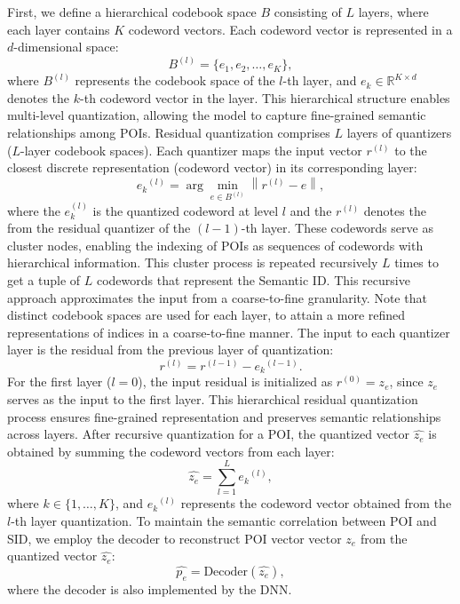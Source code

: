 First, we define a hierarchical codebook space $B$ consisting of $L$ layers, where each layer contains $K$ codeword vectors. 
Each codeword vector is represented in a $d$-dimensional space:
\begin{equation}
    B^{(l)} = \{e_1, e_2, \dots, e_K\},
\end{equation}
where $B^{(l)}$ represents the codebook space of the $l$-th layer, and $e_k \in \mathbb{R}^{K \times d}$ denotes the $k$-th codeword vector in the layer. 
This hierarchical structure enables multi-level quantization, allowing the model to capture fine-grained semantic relationships among POIs.
Residual quantization comprises $L$ layers of quantizers (\aka $L$-layer codebook spaces). 
Each quantizer maps the input vector $r^{(l)}$ to the closest discrete representation (codeword vector) in its corresponding layer:
\begin{equation}
{e_k}^{(l)} = \arg\min_{e \in B^{(l)}} \left\|{r}^{(l)}-e \right\|, 
\end{equation}
where the  $e_k^{(l)}$  is the quantized codeword at level  $l$  and the  ${r}^{(l)}$ denotes the from the residual quantizer of the $(l-1)$-th layer. 
These codewords serve as cluster nodes, enabling the indexing of POIs as sequences of codewords with hierarchical information. This cluster process is repeated recursively $L$ times to get a tuple of  $L$ codewords that represent the Semantic ID. This recursive approach approximates the input from a coarse-to-ﬁne granularity. Note that distinct codebook spaces are used for each layer, to attain a more refined representations of indices in a coarse-to-fine manner. 
The input to each quantizer layer is the residual from the previous layer of quantization:
\begin{equation}
{r}^{(l)} = {r}^{(l-1)} - {e_k}^{(l-1)}.
\end{equation}
For the first layer ($l=0$), the input residual is initialized as ${r}^{(0)} = z_e$, since $z_e$ serves as the input to the first layer. 
This hierarchical residual quantization process ensures fine-grained representation and preserves semantic relationships across layers.
After recursive quantization for a POI, the quantized vector $ \hat{z_e} $ is obtained by summing the codeword vectors from each layer:
\begin{equation}
    \hat{z_e} = \sum_{l=1}^{L} {e_k}^{(l)},
\end{equation}
where $k \in \{1, \dots, K\}$, and ${e_k}^{(l)}$ represents the codeword vector obtained from the $l$-th layer quantization. 
To maintain the semantic correlation between POI and SID, we employ the decoder to reconstruct POI vector vector ${z_e}$ from the quantized vector $ \hat{z_e} $:
\begin{equation}
    \hat{p_e} = \text{Decoder}(\hat{z_e}),
\end{equation}
where the decoder is also implemented by the DNN.

